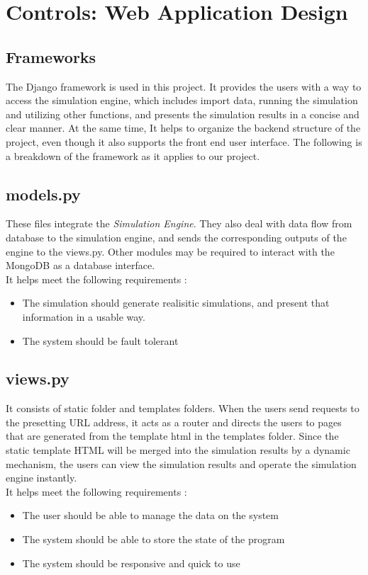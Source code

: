 \documentclass[12pt]{article}
\begin{document}
\section{Controls: Web Application Design}

\subsection{Frameworks}
The Django framework is used in this project. It provides the users with a way to access the simulation engine, which includes import data, running the simulation and utilizing other functions, and presents the simulation results in a concise and clear manner. At the same time, It helps to organize the backend structure of the project, even though it also supports the front end user interface. The following is a breakdown of the framework as it applies to our project.

\subsection{models.py}
These files integrate the \textit{Simulation Engine}. They also deal with data flow from database to the simulation engine, and sends the corresponding outputs of the engine to the views.py. Other modules may be required to interact with the MongoDB as a database interface. \\

It helps meet the following requirements :
\begin{itemize}
	\item The simulation should generate realisitic simulations, and present that information in a usable way. 
	\item The system should be fault tolerant
\end{itemize} 

\subsection{views.py}
It consists of static folder and templates folders. When the users send requests to the presetting URL address, it acts as a router and directs the users to pages that are generated from the template html in the templates folder. Since the static template HTML will be merged into the simulation results by a dynamic mechanism, the users can view the simulation results and operate the simulation engine instantly. \\ 

It helps meet the following requirements :
\begin{itemize}
	\item The user should be able to manage the data on the system
	\item The system should be able to store the state of the program
	\item The system should be responsive and quick to use
\end{itemize} 
\end{document}
